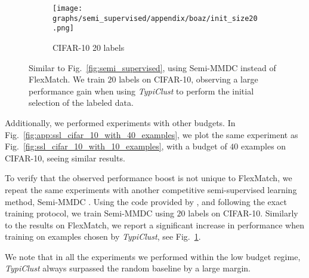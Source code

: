 \documentclass{article}
\begin{document}
\begin{figure}[htb!]
\begin{center}
    \begin{subfigure}{.25\textwidth}
      \centering
      \texttt{[image: graphs/semi\_supervised/appendix/boaz/init\_size20.png]}
    \vspace{-0.75cm}
    \caption{CIFAR-10 20 labels}
\end{subfigure}
\caption{Similar to Fig.~\ref{fig:semi_supervised}, using Semi-MMDC instead of FlexMatch. We train $20$ labels on CIFAR-10, observing a large performance gain when using \emph{TypiClust} to perform the initial selection of the labeled data.}
\vspace{-0.3cm}
\label{fig:app:boaz_cifar10_20_labels}
\end{center}
\end{figure}

Additionally, we performed experiments with other budgets. In Fig.~\ref{fig:app:ssl_cifar_10_with_40_examples}, we plot the same experiment as Fig.~\ref{fig:ssl_cifar_10_with_10_examples}, with a budget of $40$ examples on CIFAR-10, seeing similar results.

To verify that the observed performance boost is not unique to FlexMatch, we repeat the same experiments with another competitive semi-supervised learning method, 	
Semi-MMDC \citep{lerner2020boosting}. Using the code provided by \citet{lerner2020boosting}, and following the exact training protocol, we train Semi-MMDC using $20$ labels on CIFAR-10. Similarly to the results on FlexMatch, we report a significant increase in performance when training on examples chosen by \emph{TypiClust}, see Fig.~\ref{fig:app:boaz_cifar10_20_labels}.


We note that in all the experiments we performed within the low budget regime, \emph{TypiClust} always surpassed the random baseline by a large margin.
\end{document}
